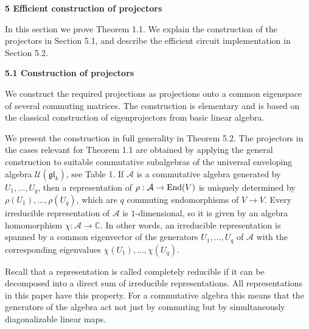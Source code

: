 

\par\medskip\noindent\textbf{5 Efficient construction of projectors}\par




In this section we prove Theorem 1.1.
We explain the construction of the projectors in Section 5.1, and describe the efficient circuit implementation in Section 5.2.





\par\medskip\noindent\textbf{5.1 Construction of projectors}\par




We construct the required projections as projections onto a common eigenspace of several commuting matrices. The construction is elementary and is based on the classical construction of eigenprojectors from basic linear algebra.





We present the construction in full generality in Theorem 5.2. The projectors in the cases relevant for Theorem 1.1 are obtained by applying the general construction to suitable commutative subalgebras of the universal enveloping algebra $\mathcal{U}(\mathfrak{gl}_{k})$, see Table 1. If $\mathcal{A}$ is a commutative algebra generated by $U_{1},\dots,U_{q}$, then a representation of $\rho:\mathcal{A}\to\textnormal{End}(V)$ is uniquely determined by $\rho(U_{1}),\ldots,\rho(U_{q})$, which are $q$ commuting endomorphisms of $V\to V$.
Every irreducible representation of $\mathcal{A}$ is $1$-dimensional, so it is given by an algebra homomorphism $\chi\colon\mathcal{A}\to\mathbb{C}$.
In other words, an irreducible representation is spanned by a common eigenvector of the generators $U_{1},\dots,U_{q}$ of $\mathcal{A}$ with the corresponding eigenvalues $\chi(U_{1}),\dots,\chi(U_{q})$.





Recall that a representation is called completely reducible if it can be decomposed into a direct sum of irreducible representations.
All representations in this paper have this property.
For a commutative algebra this means that the generators of the algebra act not just by commuting but by simultaneously diagonalizable linear maps.





